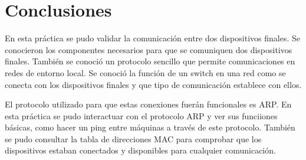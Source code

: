 \section*{Conclusiones}
{
    \hspace{0.5cm}
    En esta pr\'actica se pudo validar la comunicaci\'on entre dos dispositivos finales. Se conocieron los componentes
    necesarios para que se comuniquen dos dispositivos finales. Tambi\'en se conoci\'o un protocolo sencillo que permite
    comunicaciones en redes de entorno local. Se conoci\'o la funci\'on de un switch en una red como se conecta con los 
    dispositivos finales y que tipo de comunicaci\'on establece con ellos.\newline
    
    El protocolo utilizado para que estas conexiones fuer\'an funcionales es ARP. En esta pr\'actica se pudo interactuar
    con el protocolo ARP y ver sus funciiones b\'asicas, como hacer un ping entre m\'aquinas a trav\'es de este protocolo. Tambi\'en se 
    pudo consultar la tabla de direcciones MAC para comprobar que los dispositivos estaban conectados y disponibles para cualquier
    comunicaci\'on.
}

